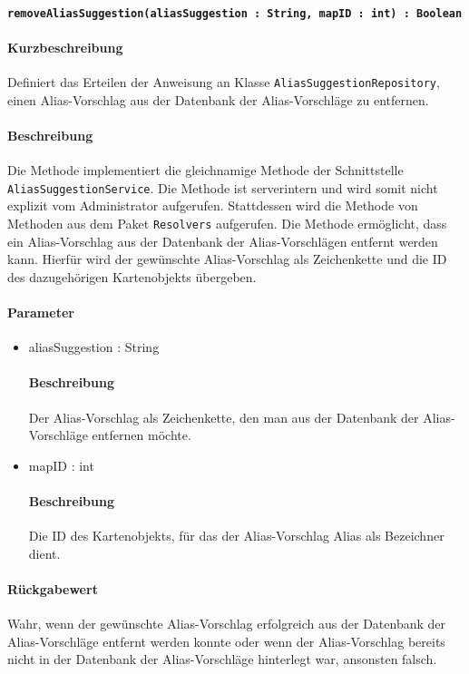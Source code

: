 \paragraph{\texttt{removeAliasSuggestion(aliasSuggestion : String, mapID : int) : Boolean}}%
\paragraph*{Kurzbeschreibung}
Definiert das Erteilen der Anweisung an Klasse \texttt{AliasSuggestionRepository}, einen Alias-Vorschlag aus der Datenbank der Alias-Vorschläge zu entfernen.
\paragraph*{Beschreibung}
Die Methode implementiert die gleichnamige Methode der Schnittstelle \texttt{AliasSuggestionService}.
Die Methode ist serverintern und wird somit nicht explizit vom Administrator aufgerufen.
Stattdessen wird die Methode von Methoden aus dem Paket \texttt{Resolvers} aufgerufen.
Die Methode ermöglicht, dass ein Alias-Vorschlag aus der Datenbank der Alias-Vorschlägen entfernt werden kann.
Hierfür wird der gewünschte Alias-Vorschlag als Zeichenkette und die ID des dazugehörigen Kartenobjekts übergeben.
\paragraph*{Parameter}
\begin{itemize}
    \item aliasSuggestion : String
    		\paragraph*{Beschreibung}
    		Der Alias-Vorschlag als Zeichenkette, den man aus der Datenbank der Alias-Vorschläge entfernen möchte.
    \item mapID : int
    		\paragraph*{Beschreibung}
    		Die ID des Kartenobjekts, für das der Alias-Vorschlag Alias als Bezeichner dient.
\end{itemize}
\paragraph*{Rückgabewert}
Wahr, wenn der gewünschte Alias-Vorschlag erfolgreich aus der Datenbank der Alias-Vorschläge entfernt werden konnte oder wenn der Alias-Vorschlag bereits nicht in der Datenbank der Alias-Vorschläge hinterlegt war, ansonsten falsch.

